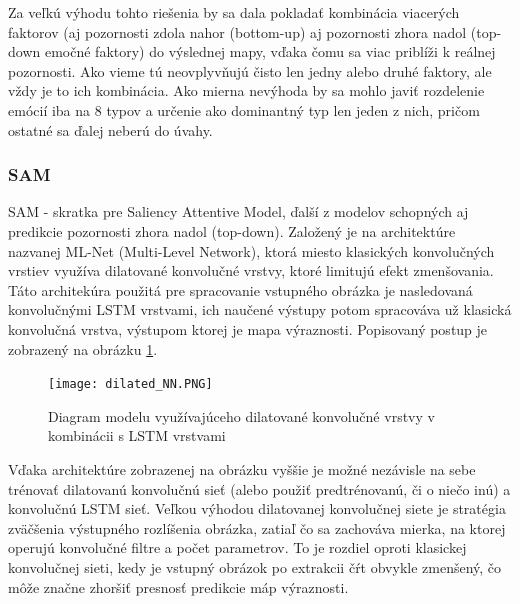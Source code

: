 Za veľkú výhodu tohto riešenia by sa dala pokladať kombinácia viacerých faktorov (aj pozornosti zdola nahor (bottom-up) aj pozornosti zhora nadol (top-down emočné faktory)  do výslednej mapy, vďaka čomu sa viac priblíži k reálnej pozornosti. Ako vieme tú neovplyvňujú čisto len jedny alebo druhé faktory, ale vždy je to ich kombinácia. Ako mierna nevýhoda by sa mohlo javiť rozdelenie emócií iba na 8 typov a určenie ako dominantný typ len jeden z nich, pričom ostatné sa ďalej neberú do úvahy.  


\subsubsection{SAM}
SAM - skratka pre Saliency Attentive Model\cite{cornia2016predicting}, ďalší z modelov schopných aj predikcie pozornosti zhora nadol (top-down). Založený je na architektúre nazvanej ML-Net (Multi-Level Network\cite{cornia2016deep}), ktorá miesto klasických konvolučných vrstiev využíva dilatované konvolučné vrstvy, ktoré limitujú efekt zmenšovania. Táto architekúra použitá pre spracovanie vstupného obrázka je nasledovaná konvolučnými LSTM vrstvami, ich naučené výstupy potom spracováva už klasická konvolučná vrstva, výstupom ktorej je mapa výraznosti. Popisovaný postup je zobrazený na obrázku \ref{dilated_model_image}.

\begin{figure}[H]
	\begin{center}
		\texttt{[image: dilated\_NN.PNG]}
		\caption[Diagram konvolučnej LSTM siete]{Diagram modelu využívajúceho dilatované konvolučné vrstvy v kombinácii s LSTM vrstvami \cite{cornia2016predicting}\label{dilated_model_image}}
	\end{center}
\end{figure}

Vďaka architektúre zobrazenej na obrázku vyššie je možné nezávisle na sebe trénovať dilatovanú konvolučnú sieť (alebo použiť predtrénovanú, či o niečo inú) a konvolučnú LSTM sieť. Veľkou výhodou dilatovanej konvolučnej siete je stratégia zväčšenia výstupného rozlíšenia obrázka, zatiaľ čo sa zachováva mierka, na ktorej operujú konvolučné filtre a počet parametrov. To je rozdiel oproti klasickej konvolučnej sieti, kedy je vstupný obrázok po extrakcii čŕt obvykle zmenšený, čo môže značne zhoršiť presnosť predikcie máp výraznosti.

